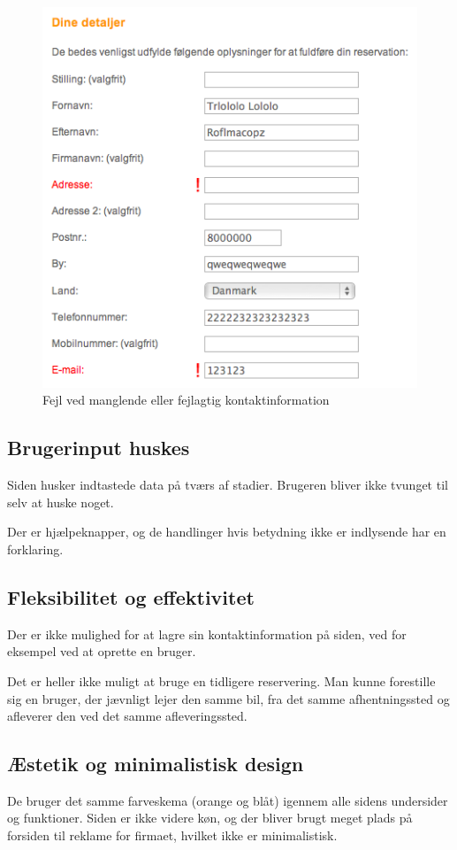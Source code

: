 \documentclass[a4paper]{article}
\begin{document}
\begin{figure}[htbp]
  \begin{center}
    \includegraphics[scale=.6]{8.png}
  \end{center}
  \caption{Fejl ved manglende eller fejlagtig kontaktinformation}
  \label{fejl_kontaktinformation}
\end{figure}


\subsection{Brugerinput huskes}
Siden husker indtastede data på tværs af stadier. Brugeren bliver ikke tvunget
til selv at huske noget.

Der er hjælpeknapper, og de handlinger hvis betydning ikke er indlysende har en
forklaring.

\subsection{Fleksibilitet og effektivitet}
Der er ikke mulighed for at lagre sin kontaktinformation på siden, ved
for eksempel ved at oprette en bruger.

Det er heller ikke muligt at bruge en tidligere reservering. Man kunne
forestille sig en bruger, der jævnligt lejer den samme bil, fra det samme
afhentningssted og afleverer den ved det samme afleveringssted.

\subsection{Æstetik og minimalistisk design}
De bruger det samme farveskema (orange og blåt) igennem alle sidens
undersider og funktioner. Siden er ikke videre køn, og der bliver brugt meget
plads på forsiden til reklame for firmaet, hvilket ikke er minimalistisk.
\end{document}
